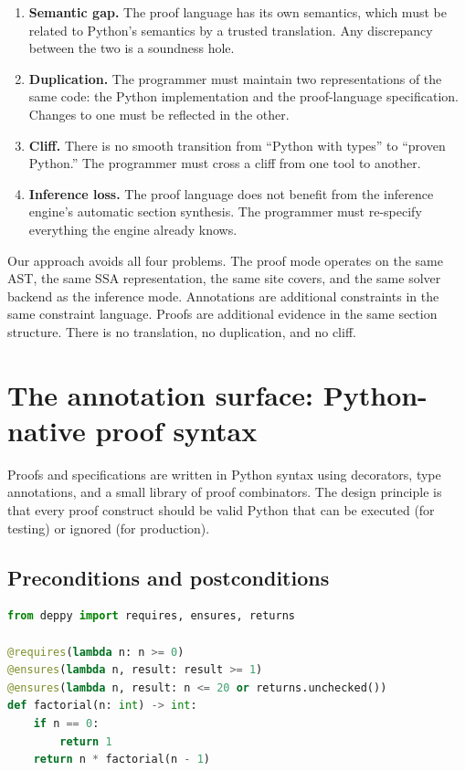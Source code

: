 \documentclass[11pt]{report}
\theoremstyle{definition}
\theoremstyle{plain}
\begin{document}
\begin{enumerate}[nosep]
  \item \textbf{Semantic gap.} The proof language has its own semantics,
        which must be related to Python's semantics by a trusted translation.
        Any discrepancy between the two is a soundness hole.
  \item \textbf{Duplication.} The programmer must maintain two representations
        of the same code: the Python implementation and the proof-language
        specification. Changes to one must be reflected in the other.
  \item \textbf{Cliff.} There is no smooth transition from ``Python with
        types'' to ``proven Python.'' The programmer must cross a cliff from
        one tool to another.
  \item \textbf{Inference loss.} The proof language does not benefit from the
        inference engine's automatic section synthesis. The programmer must
        re-specify everything the engine already knows.
\end{enumerate}

Our approach avoids all four problems. The proof mode operates on the same
AST, the same SSA representation, the same site covers, and the same solver
backend as the inference mode. Annotations are additional constraints in the
same constraint language. Proofs are additional evidence in the same section
structure. There is no translation, no duplication, and no cliff.

\section{The annotation surface: Python-native proof syntax}

Proofs and specifications are written in Python syntax using decorators,
type annotations, and a small library of proof combinators. The design
principle is that every proof construct should be valid Python that can
be executed (for testing) or ignored (for production).

\subsection{Preconditions and postconditions}

\begin{lstlisting}[style=deppy,language=Python]
from deppy import requires, ensures, returns

@requires(lambda n: n >= 0)
@ensures(lambda n, result: result >= 1)
@ensures(lambda n, result: n <= 20 or returns.unchecked())
def factorial(n: int) -> int:
    if n == 0:
        return 1
    return n * factorial(n - 1)
\end{lstlisting}
\end{document}

